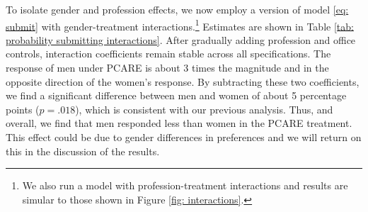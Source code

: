 \documentclass[12pt, titlepage]{article}
\begin{document}
To isolate gender and profession effects, we now employ a version of
model \eqref{eq: submit} with gender-treatment interactions.\footnote{We
  also run a model with profession-treatment interactions and results
  are simular to those shown in Figure \ref{fig: interactions}.}
Estimates are shown in Table
\ref{tab: probability submitting interactions}. After gradually adding
profession and office controls, interaction coefficients remain stable
across all specifications. The response of men under PCARE is about 3
times the magnitude and in the opposite direction of the women's
response. By subtracting these two coefficients, we find a significant
difference between men and women of about 5 percentage points
(\(p=.018\)), which is consistent with our previous analysis. Thus, and
overall, we find that men responded less than women in the PCARE
treatment. This effect could be due to gender differences in preferences
and we will return on this in the discussion of the results.
\end{document}
